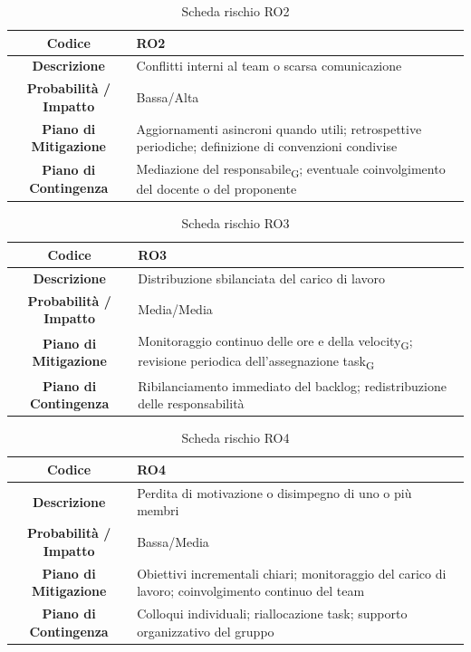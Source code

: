 \begin{table}[H]
	\centering
	\renewcommand{\arraystretch}{1.3}
	\begin{tabularx}{\textwidth}{|c|X|}
		\hline
		\textbf{Codice} & \textbf{RO2} \\
		\hline
		\textbf{Descrizione} & Conflitti interni al team o scarsa comunicazione \\
		\hline
		\textbf{Probabilità / Impatto} & Bassa/Alta \\
		\hline
		\textbf{Piano di Mitigazione} & Aggiornamenti asincroni quando utili; retrospettive periodiche; definizione di convenzioni condivise \\
		\hline
		\textbf{Piano di Contingenza} & Mediazione del responsabile\textsubscript{G}; eventuale coinvolgimento del docente o del proponente \\
		\hline
	\end{tabularx}
	\caption{Scheda rischio RO2}
\end{table}

\begin{table}[H]
	\centering
	\renewcommand{\arraystretch}{1.3}
	\begin{tabularx}{\textwidth}{|c|X|}
		\hline
		\textbf{Codice} & \textbf{RO3} \\
		\hline
		\textbf{Descrizione} & Distribuzione sbilanciata del carico di lavoro \\
		\hline
		\textbf{Probabilità / Impatto} & Media/Media \\
		\hline
		\textbf{Piano di Mitigazione} & Monitoraggio continuo delle ore e della velocity\textsubscript{G}; revisione periodica dell'assegnazione task\textsubscript{G} \\
		\hline
		\textbf{Piano di Contingenza} & Ribilanciamento immediato del backlog; redistribuzione delle responsabilità \\
		\hline
	\end{tabularx}
	\caption{Scheda rischio RO3}
\end{table}

\begin{table}[H]
	\centering
	\renewcommand{\arraystretch}{1.3}
	\begin{tabularx}{\textwidth}{|c|X|}
		\hline
		\textbf{Codice} & \textbf{RO4} \\
		\hline
		\textbf{Descrizione} & Perdita di motivazione o disimpegno di uno o più membri \\
		\hline
		\textbf{Probabilità / Impatto} & Bassa/Media \\
		\hline
		\textbf{Piano di Mitigazione} & Obiettivi incrementali chiari; monitoraggio del carico di lavoro; coinvolgimento continuo del team \\
		\hline
		\textbf{Piano di Contingenza} & Colloqui individuali; riallocazione task; supporto organizzativo del gruppo \\
		\hline
	\end{tabularx}
	\caption{Scheda rischio RO4}
\end{table}

